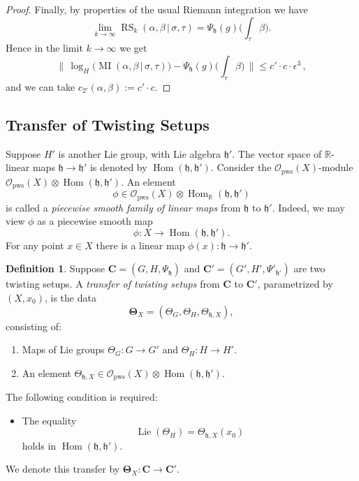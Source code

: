 \documentclass[10pt, a4paper]{amsart}
\theoremstyle{definition}
\newtheorem{dfn}[equation]{Definition}
\numberwithin{equation}{section}
\newcommand{\opn}{\operatorname}
\newcommand{\rmitem}[1]{\item[\text{\textup{(#1)}}]}
\newcommand{\mfrak}[1]{\mathfrak{#1}}
\newcommand{\mcal}[1]{\mathcal{#1}}
\newcommand{\mbf}[1]{\mathbf{#1}}
\newcommand{\mrm}[1]{\mathrm{#1}}
\newcommand{\mbb}[1]{\mathbb{#1}}
\newcommand{\bsym}[1]{\boldsymbol{#1}}
\newcommand{\Norm}[1]{\bigl\lVert\, #1 \, \bigr\rVert}
\renewcommand{\vert}{\, | \,}
\newcommand{\R}{\mbb{R}}
\newcommand{\h}{\mfrak{h}}
\begin{document}
\begin{proof}
Finally, by properties of the usual Riemann integration we have
\begin{equation*} \label{eqn:194}
\lim_{k \to  \infty} \opn{RS}_k(\alpha, \beta \vert \sigma, \tau) = 
\Psi_{\h}(g)\bigl( \int_{\tau} \beta \bigr) .
\end{equation*}
Hence in the limit $k \to \infty$ we get
\[ \Norm{ \opn{log}_H \bigl( \opn{MI}(\alpha, \beta \vert \sigma, \tau)
\bigr) -
\Psi_{\h}(g)\bigl( \int_{\tau} \beta \bigr)  } \leq 
c' \cdot c \cdot  \epsilon^3 \, , \]
and we can take
$c_{2'}(\alpha, \beta) := c' \cdot c$.
\end{proof}



\subsection{Transfer of Twisting Setups}

Suppose $H'$ is another Lie group, with Lie algebra $\h'$. 
The vector space of $\R$-linear maps $\h \to \h'$ is denoted by
$\opn{Hom}(\h, \h')$. 
Consider the $\mcal{O}_{\mrm{pws}}(X)$-module 
$\mcal{O}_{\mrm{pws}}(X) \otimes \opn{Hom}(\h, \h')$.
An element 
\[ \phi \in \mcal{O}_{\mrm{pws}}(X) \otimes \opn{Hom}_{\R}(\h, \h') \]
is called a {\em piecewise smooth family of linear maps} from $\h$ to $\h'$.
Indeed, we may view $\phi$ as a piecewise smooth map
\[ \phi : X \to \opn{Hom}(\h, \h') . \]
For any point $x \in X$ there is a linear map
$\phi(x) : \h \to \h'$.

\begin{dfn} \label{dfn:7}
Suppose $\mbf{C} = (G, H, \Psi_{\h})$ and 
$\mbf{C}' = (G', H', \Psi'_{\h'})$ are two twisting
setups. A {\em transfer of twisting setups} from $\mbf{C}$
to $\mbf{C}'$, parametrized by $(X, x_0)$, is the data
\[ \bsym{\Theta}_X = (\Theta_G, \Theta_H, \Theta_{\h, X}) , \] 
consisting of:
\begin{enumerate}
\item Maps of Lie groups
$\Theta_G : G \to G'$ and 
$\Theta_H : H \to H'$.

\item An element
$\Theta_{\h, X} \in \mcal{O}_{\mrm{pws}}(X) \otimes \opn{Hom}(\h, \h')$.
\end{enumerate}

The following condition is required: 
\begin{itemize}
\rmitem{$*$} The equality 
\[ \opn{Lie}(\Theta_H) = \Theta_{\h, X}(x_0) \]
holds in $\opn{Hom}(\h, \h')$.
\end{itemize}

We denote this transfer by
$\bsym{\Theta}_X : \mbf{C} \to \mbf{C}'$.
\end{dfn}
\end{document}
